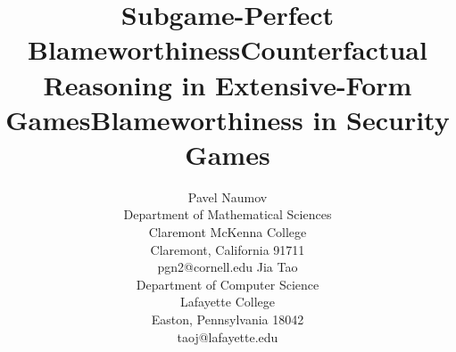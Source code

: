 \documentclass[letterpaper]{article}
\begin{document}
%


\newtheorem{theorem}{Theorem}
\newtheorem{lemma}{Lemma}
\newtheorem{claim}{Claim}
\newtheorem{proposition}{Proposition}
\newtheorem{definition}{Definition}
\newtheorem{corollary}{Corollary}
\renewcommand{\phi}{\varphi}
\renewcommand{\epsilon}{\varepsilon}
\newcommand{\<}{\langle}
\renewcommand{\>}{\rangle}
\newenvironment{proof}{\noindent{\sc Proof.}}{\hfill $\boxtimes\hspace{2mm}$\linebreak}
\newcommand{\qed}{\hfill $\boxtimes\hspace{1mm}$}%

\newenvironment{proof-of-claim}{\noindent{\sc Proof of Claim.}}{\hfill $\boxtimes\hspace{2mm}$\linebreak}


\renewcommand{\H}{{\sf H}}
\newcommand{\C}{{\sf C}}
\newcommand{\N}{{\sf N}}
\newcommand{\B}{{\sf B}}
\newcommand{\cN}{{\sf \overline{N}}}
\newcommand{\cR}{{\sf \overline{R}}}
\newcommand{\KR}{\,\mbox{\scalebox{.75}{\framebox(10,10){$\sf R$}}}\,}
\newcommand{\KN}{\,\mbox{\scalebox{.75}{\framebox(10,10){$\sf N$}}}\,}
\renewcommand{\Box}{\,\mbox{\scalebox{.75}{\framebox(10,10){$ $}}}\,}
\newcommand{\cKN}{\overline{\mbox{\scalebox{.75}{\framebox(10,10){$\sf N$}}}}}
\newcommand{\R}{{\sf R}}
\renewcommand{\S}{{\sf S}}
\newcommand{\D}{{\sf D}}
\newcommand{\A}{{\sf A}}

\newsavebox{\diamonddotsavebox}
\sbox{\diamonddotsavebox}{$\Diamond$\hspace{-1.8mm}\raisebox{0.3mm}{$\cdot$}\hspace{1mm}}
\newcommand{\diamonddot}{\usebox{\diamonddotsavebox}}


\title{Subgame-Perfect Blameworthiness}

\title{Counterfactual Reasoning in  Extensive-Form Games}

\title{Blameworthiness in Security Games}


\author{Pavel Naumov \\Department of Mathematical Sciences\\  Claremont McKenna College\\Claremont, California 91711\\pgn2@cornell.edu
\And  Jia Tao \\Department of Computer Science\\Lafayette College\\Easton, Pennsylvania 18042\\taoj@lafayette.edu}
\end{document}
